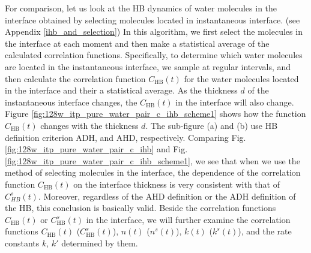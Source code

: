 {For comparison, let us look at the HB dynamics of water molecules in the interface obtained by selecting molecules 
located in instantaneous interface. (see Appendix \ref{ihb_and_selection}) 
In this algorithm, we first select the molecules in the interface at each moment and then make a statistical
average of the calculated correlation functions.
Specifically, to determine which water molecules are located in the instantaneous interface, we sample at regular intervals, and then calculate 
the correlation function $C_\text{HB}(t)$ for the water molecules located in the interface and their a statistical average.
As the thickness $d$ of the instantaneous interface changes, the $C_\text{HB}(t)$ in the interface will also change. 
Figure \ref{fig:128w_itp_pure_water_pair_c_ihb_scheme1} shows how the function $C_\text{HB}(t)$ changes with the thickness $d$.
The sub-figure (a) and (b) use HB definition criterion ADH, and AHD, respectively.
Comparing Fig.\thinspace\ref{fig:128w_itp_pure_water_pair_c_ihb} and Fig.\thinspace\ref{fig:128w_itp_pure_water_pair_c_ihb_scheme1}, we see that
when we use the method of selecting molecules in the interface, the dependence of the correlation function $C_\text{HB}(t)$  
on the interface thickness is very consistent with that of $C^s_{HB}(t)$. Moreover, regardless of the AHD definition 
or the ADH definition of the HB, this conclusion is basically valid. Beside the correlation functions $C_\text{HB}(t)$ or $C^s_\text{HB}(t)$ in the interface, we will further examine the correlation 
functions $C_\text{HB}(t)$ ($C^s_\text{HB}(t)$), $n(t)$ ($n^s(t)$), $k(t)$ ($k^s(t)$), and the rate constants $k$, $k'$ determined by them.

\FloatBarrier
}
